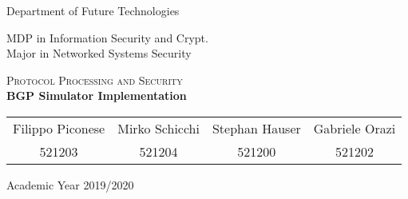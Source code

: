 \pagestyle{plain}

\thispagestyle{empty}

\begin{center}
  \begin{figure}[h!]
    \centerline{}
  \end{figure}


  \LARGE{Department of Future Technologies}

  \vspace{1 cm}
  \Large{MDP in Information Security and Crypt.\\
  Major in Networked Systems Security}

  \vspace{2 cm}
  \vspace{1 cm}
  \Huge\textsc{Protocol Processing and Security\\}
  \vspace{1cm}
  \LARGE{\textbf{BGP Simulator Implementation}\\}


  \vspace{4 cm}
  \begin{tabular}{cccc}
    Filippo Piconese & Mirko Schicchi & Stephan Hauser & Gabriele Orazi\\
    521203 & 521204 & 521200 & 521202\\
  \end{tabular}

  \vfill

  {\Large{Academic Year 2019/2020}}
\end{center}
